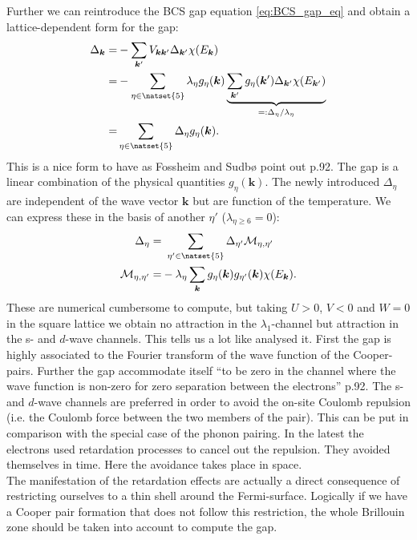 \documentclass[../main.tex]{subfile}
\begin{document}
Further we can reintroduce the BCS gap equation \ref{eq:BCS_gap_eq} and obtain a lattice-dependent form for the gap:
\begin{equation}
    \begin{aligned}
    \Delta_{\bm{k}} =& -\sum_{\bm{k}'} V_{\bm{k}\bm{k}'}\Delta_{\bm{k}'}\chi(E_{\bm{k}})\\
    =& -\sum_{\eta\in\natset{5}} \lambda_{\eta} g_{\eta}(\bm{k}) \underbrace{\sum_{\bm{k}'} g_{\eta}(\bm{k}') \Delta_{\bm{k}'}\chi(E_{\bm{k}'})}_{=: \Delta_{\eta}/\lambda_{\eta}}\\
    =& \sum_{\eta\in\natset{5}}\Delta_{\eta} g_{\eta}(\bm{k}).
    \end{aligned}
\end{equation}
This is a nice form to have as Fossheim and Sudbø \cite{FossheimSudbo2004} point out p.92. The gap is a linear combination of the physical quantities $g_{\eta}(\bm{k})$.
The newly introduced $\Delta_{\eta}$ are independent of the wave vector $\bm{k}$ but are function of the temperature. We can express these in the basis 
of another $\eta'$ ($\lambda_{\eta\ge6} =0$):
\begin{align*}
    \Delta_{\eta} = &~\sum_{\eta' \in \natset{5}} \Delta_{\eta'} \mathcal{M}_{\eta,\eta'}\\
    \mathcal{M}_{\eta,\eta'} =& -\lambda_{\eta}\sum_{\bm{k}} g_{\eta}(\bm{k})g_{\eta'}(\bm{k}) \chi(E_{\bm{k}}).
\end{align*}
These are numerical cumbersome to compute, but taking $U>0$, $V<0$ and $W=0$ in the square lattice we obtain no attraction in the 
$\lambda_1$-channel but attraction in the s- and $d$-wave channels. This tells us a lot like \cite{FossheimSudbo2004} analysed it. 
First the gap is highly associated to the Fourier transform of the wave function of the Cooper-pairs.    
Further the gap accommodate itself ``to be zero in the channel where the wave function is non-zero for zero separation between the electrons''\cite{FossheimSudbo2004} p.92.
The s- and $d$-wave channels are preferred in order to avoid the on-site Coulomb repulsion (i.e. the Coulomb force between the two members of the pair).
This can be put in comparison with the special
case of the phonon pairing. In the latest the electrons used retardation processes to cancel out the repulsion. They avoided themselves in time. 
Here the avoidance takes place in space.\\

The manifestation of the retardation effects are actually a direct consequence of restricting ourselves to a thin shell around the Fermi-surface.
Logically if we have a Cooper pair formation that does not follow this restriction, the whole Brillouin zone should be taken into account to compute the gap.\\
\end{document}

